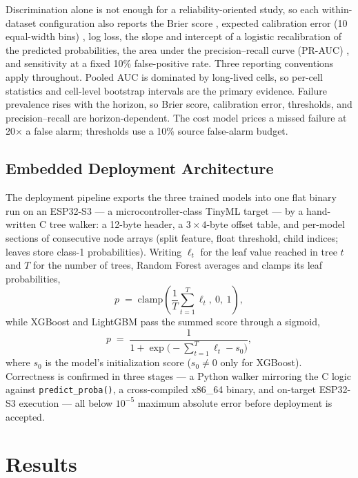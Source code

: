 \documentclass[11pt,a4paper]{article}
\begin{document}
Discrimination alone is not enough for a reliability-oriented study, so each within-dataset configuration also reports the Brier score \cite{brier1950verification}, expected calibration error (10 equal-width bins) \cite{guo2017calibration}, log loss, the slope and intercept of a logistic recalibration of the predicted probabilities, the area under the precision--recall curve (PR-AUC) \cite{saito2015precision}, and sensitivity at a fixed 10\% false-positive rate. Three reporting conventions apply throughout. Pooled AUC is dominated by long-lived cells, so per-cell statistics and cell-level bootstrap intervals are the primary evidence. Failure prevalence rises with the horizon, so Brier score, calibration error, thresholds, and precision--recall are horizon-dependent. The cost model prices a missed failure at 20$\times$ a false alarm; thresholds use a 10\% source false-alarm budget.

\subsection{Embedded Deployment Architecture}
The deployment pipeline exports the three trained models into one flat binary run on an ESP32-S3 --- a microcontroller-class TinyML target \cite{banbury2021mlperf} --- by a hand-written C tree walker: a 12-byte header, a $3{\times}4$-byte offset table, and per-model sections of consecutive node arrays (split feature, float threshold, child indices; leaves store class-1 probabilities). Writing $\ell_t$ for the leaf value reached in tree $t$ and $T$ for the number of trees, Random Forest averages and clamps its leaf probabilities,
\begin{equation}\label{eq:rf}
p \;=\; \mathrm{clamp}\!\left(\frac{1}{T}\sum_{t=1}^{T}\ell_t,\ 0,\ 1\right),
\end{equation}
while XGBoost and LightGBM pass the summed score through a sigmoid,
\begin{equation}\label{eq:sigmoid}
p \;=\; \frac{1}{1+\exp\!\bigl(-\textstyle\sum_{t=1}^{T}\ell_t - s_0\bigr)},
\end{equation}
where $s_0$ is the model's initialization score ($s_0\neq 0$ only for XGBoost). Correctness is confirmed in three stages --- a Python walker mirroring the C logic against \texttt{predict\_proba()}, a cross-compiled x86\_64 binary, and on-target ESP32-S3 execution --- all below $10^{-5}$ maximum absolute error before deployment is accepted.

\section{Results}
\end{document}
